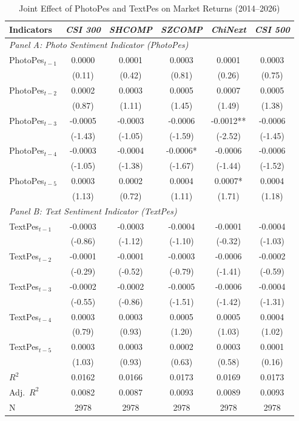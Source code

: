 \documentclass[AER]{AEA}
\begin{document}
\begin{table}[h!]
    \caption{Joint Effect of PhotoPes and TextPes on Market Returns (2014--2026)}
    \label{tab:sentiment_interaction_results}
    \centering
    \small
    \begin{tabular}{lccccc}
    \toprule
    Indicators & \textit{CSI 300} & \textit{SHCOMP} & \textit{SZCOMP} & \textit{ChiNext} & \textit{CSI 500} \\
    \midrule
    \multicolumn{6}{l}{\textit{Panel A: Photo Sentiment Indicator (PhotoPes)}} \\
    \midrule
    PhotoPes$_{t-1}$ & 0.0000 & 0.0001 & 0.0003 & 0.0001 & 0.0003 \\
     & (0.11) & (0.42) & (0.81) & (0.26) & (0.75) \\
    PhotoPes$_{t-2}$ & 0.0002 & 0.0003 & 0.0005 & 0.0007 & 0.0005 \\
     & (0.87) & (1.11) & (1.45) & (1.49) & (1.38) \\
    PhotoPes$_{t-3}$ & -0.0005 & -0.0003 & -0.0006 & -0.0012** & -0.0006 \\
     & (-1.43) & (-1.05) & (-1.59) & (-2.52) & (-1.45) \\
    PhotoPes$_{t-4}$ & -0.0003 & -0.0004 & -0.0006* & -0.0006 & -0.0006 \\
     & (-1.05) & (-1.38) & (-1.67) & (-1.44) & (-1.52) \\
    PhotoPes$_{t-5}$ & 0.0003 & 0.0002 & 0.0004 & 0.0007* & 0.0004 \\
     & (1.13) & (0.72) & (1.11) & (1.71) & (1.18) \\
    \midrule
    \multicolumn{6}{l}{\textit{Panel B: Text Sentiment Indicator (TextPes)}} \\
    \midrule
    TextPes$_{t-1}$ & -0.0003 & -0.0003 & -0.0004 & -0.0001 & -0.0004 \\
     & (-0.86) & (-1.12) & (-1.10) & (-0.32) & (-1.03) \\
    TextPes$_{t-2}$ & -0.0001 & -0.0001 & -0.0003 & -0.0006 & -0.0002 \\
     & (-0.29) & (-0.52) & (-0.79) & (-1.41) & (-0.59) \\
    TextPes$_{t-3}$ & -0.0002 & -0.0002 & -0.0005 & -0.0006 & -0.0004 \\
     & (-0.55) & (-0.86) & (-1.51) & (-1.42) & (-1.31) \\
    TextPes$_{t-4}$ & 0.0003 & 0.0003 & 0.0005 & 0.0005 & 0.0004 \\
     & (0.79) & (0.93) & (1.20) & (1.03) & (1.02) \\
    TextPes$_{t-5}$ & 0.0003 & 0.0003 & 0.0002 & 0.0003 & 0.0001 \\
     & (1.03) & (0.93) & (0.63) & (0.58) & (0.16) \\
    \midrule
    $R^2$ & 0.0162 & 0.0166 & 0.0173 & 0.0169 & 0.0173 \\
    Adj.\ $R^2$ & 0.0082 & 0.0087 & 0.0093 & 0.0089 & 0.0093 \\
    N & 2978 & 2978 & 2978 & 2978 & 2978 \\
    \bottomrule
    \end{tabular}


\end{table}
\end{document}
